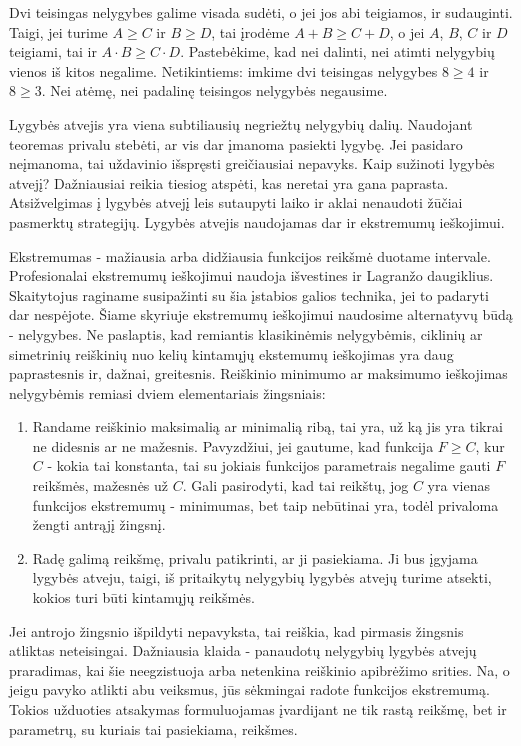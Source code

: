 Dvi teisingas nelygybes galime visada sudėti, o jei jos abi teigiamos, ir
sudauginti. Taigi, jei turime $A\geq C$ ir $B\geq D$, tai įrodėme $A+B\geq
C+D$, o jei $A$, $B$, $C$ ir $D$ teigiami, tai ir $A\cdot B\geq C\cdot D$.
Pastebėkime, kad nei dalinti, nei atimti nelygybių vienos iš kitos
negalime.  Netikintiems: imkime dvi teisingas nelygybes $8\geq4$ ir
$8\geq3$. Nei atėmę, nei padalinę teisingos nelygybės negausime.

Lygybės atvejis yra viena subtiliausių negriežtų nelygybių dalių. Naudojant
teoremas privalu stebėti, ar vis dar įmanoma pasiekti lygybę. Jei pasidaro
neįmanoma, tai uždavinio išspręsti greičiausiai nepavyks. Kaip sužinoti
lygybės atvejį? Dažniausiai reikia tiesiog atspėti, kas neretai yra gana
paprasta. Atsižvelgimas į lygybės atvejį leis sutaupyti laiko ir aklai
nenaudoti žūčiai pasmerktų strategijų. Lygybės atvejis naudojamas dar ir
ekstremumų ieškojimui.

Ekstremumas - mažiausia arba didžiausia funkcijos reikšmė duotame
intervale. Profesionalai ekstremumų ieškojimui naudoja išvestines ir Lagranžo
daugiklius. Skaitytojus raginame susipažinti su šia įstabios galios
technika, jei to padaryti dar nespėjote. Šiame skyriuje ekstremumų ieškojimui
naudosime alternatyvų būdą - nelygybes. Ne paslaptis, kad remiantis
klasikinėmis nelygybėmis, ciklinių ar simetrinių reiškinių nuo kelių
kintamųjų ekstemumų ieškojimas yra daug paprastesnis ir, dažnai, greitesnis.
Reiškinio minimumo ar maksimumo ieškojimas nelygybėmis remiasi dviem
elementariais žingsniais:

\begin{enumerate}
\item Randame reiškinio maksimalią ar minimalią ribą, tai yra, už ką jis
  yra tikrai ne didesnis ar ne mažesnis. Pavyzdžiui, jei gautume, kad
  funkcija $F\geq C$, kur $C$ - kokia tai konstanta, tai su jokiais
  funkcijos parametrais negalime gauti $F$ reikšmės, mažesnės už $C$. Gali
  pasirodyti, kad tai reikštų, jog $C$ yra vienas funkcijos ekstremumų -
  minimumas, bet taip nebūtinai yra, todėl privaloma žengti antrąjį
  žingsnį.
\item Radę galimą reikšmę, privalu patikrinti, ar ji pasiekiama.
  Ji bus įgyjama lygybės atveju, taigi, iš pritaikytų nelygybių lygybės
  atvejų turime atsekti, kokios turi būti kintamųjų reikšmės.
\end{enumerate}

Jei antrojo žingsnio išpildyti nepavyksta, tai reiškia, kad pirmasis
žingsnis atliktas neteisingai. Dažniausia klaida - panaudotų nelygybių
lygybės atvejų praradimas, kai šie neegzistuoja arba netenkina reiškinio
apibrėžimo srities.
Na, o jeigu pavyko atlikti abu veiksmus, jūs sėkmingai radote funkcijos
ekstremumą. Tokios užduoties atsakymas formuluojamas įvardijant ne tik
rastą reikšmę, bet ir parametrų, su kuriais tai pasiekiama, reikšmes.

